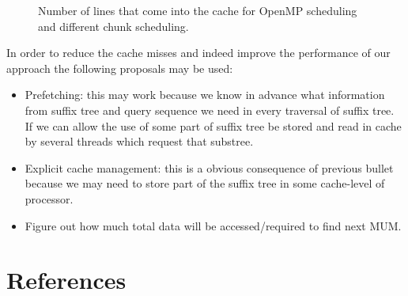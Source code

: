\documentclass[3p,times]{elsarticle}
\begin{document}
\begin{figure}
  \qquad
  \caption{Number of lines that come into the cache for OpenMP scheduling and different chunk scheduling.}
  \label{fig:l1d}
\end{figure}
In order to reduce the cache misses and indeed improve the performance of our approach the following proposals may be used:
\begin{itemize}
  \item Prefetching: this may work because we know in advance what information from suffix tree and query sequence we need in every traversal of suffix tree. If we can allow the use of some part of suffix tree be stored and read in cache by several threads which request that substree. 
  \item Explicit cache management: this is a obvious consequence of previous bullet because we may need to store part of the suffix tree in some cache-level of processor.
  \item Figure out how much total data will be accessed/required to find next MUM.
\end{itemize}



\section*{References}


\end{document}
